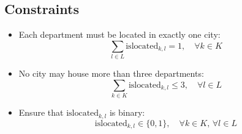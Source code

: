 \documentclass{article}
\begin{document}
\subsection*{Constraints}
\begin{itemize}
    \item Each department must be located in exactly one city:
    \[
    \sum_{l \in L} \text{islocated}_{k, l} = 1, \quad \forall k \in K
    \]
    
    \item No city may house more than three departments:
    \[
    \sum_{k \in K} \text{islocated}_{k, l} \leq 3, \quad \forall l \in L
    \]
    
    \item Ensure that \( \text{islocated}_{k, l} \) is binary:
    \[
    \text{islocated}_{k, l} \in \{0, 1\}, \quad \forall k \in K, \, \forall l \in L
    \]
\end{itemize}
\end{document}
